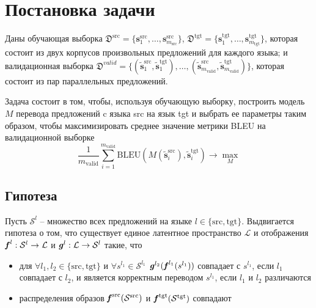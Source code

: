 \documentclass[12pt,twoside]{article}
\begin{document}
\section{Постановка задачи}
   Даны обучающая выборка $\mathfrak{D}^{\text{src}} = \{\mathbf{s}_1^{\text{src}}, \dots, \mathbf{s}_{m_\text{src}}^{\text{src}}\}$, $\mathfrak{D}^{\text{tgt}} = \{\mathbf{s}_1^{\text{tgt}}, \dots, \mathbf{s}_{m_\text{tgt}}^{\text{tgt}}\}$, которая состоит из двух корпусов произвольных предложений для каждого языка; и валидационная выборка $\mathfrak{D}^{valid} = \{(\mathbf{\tilde{s}}_1^{\text{src}}, \mathbf{\tilde{s}}_1^{\text{tgt}}), \dots, (\mathbf{\tilde{s}}_{m_{\text{valid}}}^{\text{src}}, \mathbf{\tilde{s}}_{m_{\text{valid}}}^{\text{tgt}})\}$, которая состоит из пар параллельных предложений.
   
   Задача состоит в том, чтобы, используя обучающую выборку, построить модель $M$ перевода предложений c языка src на язык tgt и выбрать ее параметры таким образом, чтобы максимизировать среднее значение метрики BLEU на валидационной выборке 
   $$
   \frac{1}{m_{\text{valid}}} \sum_{i=1}^{m_{\text{valid}}} \text{BLEU}(M(\mathbf{\tilde{s}}_i^{\text{src}}), \mathbf{\tilde{s}}_i^{\text{tgt}}) \to \max_{M}
   $$ 

\subsection{Гипотеза}
   Пусть $\mathcal{S}^{l}$ -- множество всех предложений на языке $l \in \{\text{src}, \text{tgt}\}$. Выдвигается гипотеза о том, что существует единое латентное пространство $\mathcal{L}$ и отображения $\textbf{\textit{f}}^{l}: \mathcal{S}^{l} \to \mathcal{L}$ и $\textbf{\textit{g}}^{l}: \mathcal{L} \to \mathcal{S}^{l}$ такие, что 
   \begin{itemize}
      \item для $\forall l_1, l_2 \in \{\text{src}, \text{tgt}\}$ и $\forall s^{l_1} \in \mathcal{S}^{l_1}$ $\textbf{\textit{g}}^{l_2}(\textbf{\textit{f}}^{l_1}(s^{l_1}))$ совпадает с $s^{l_1}$, если $l_1$ совпадает с $l_2$, и является корректным переводом $s^{l_1}$, если $l_1$ и $l_2$ различаются
      
      
      \item распределения образов $\textbf{\textit{f}}^{\text{src}}(\mathcal{S}^{\text{src}})$ и $\textbf{\textit{f}}^{\text{tgt}}(\mathcal{S}^{\text{tgt}})$ совпадают
   \end{itemize}
\end{document}
